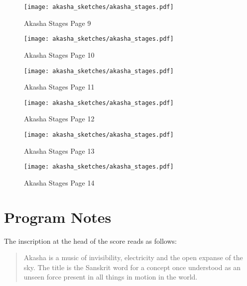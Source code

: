 \begin{figure}[H] %
    \texttt{[image: akasha\_sketches/akasha\_stages.pdf]}
    \caption{Akasha Stages Page 9}
    \label{fig:akashastagessketch-9}
\end{figure}

\begin{figure}[H] %
    \texttt{[image: akasha\_sketches/akasha\_stages.pdf]}
    \caption{Akasha Stages Page 10}
    \label{fig:akashastagessketch-10}
\end{figure}

\begin{figure}[H] %
    \texttt{[image: akasha\_sketches/akasha\_stages.pdf]}
    \caption{Akasha Stages Page 11}
    \label{fig:akashastagessketch-11}
\end{figure}

\begin{figure}[H] %
    \texttt{[image: akasha\_sketches/akasha\_stages.pdf]}
    \caption{Akasha Stages Page 12}
    \label{fig:akashastagessketch-12}
\end{figure}

\begin{figure}[H] %
    \texttt{[image: akasha\_sketches/akasha\_stages.pdf]}
    \caption{Akasha Stages Page 13}
    \label{fig:akashastagessketch-13}
\end{figure}

\begin{figure}[H] %
    \texttt{[image: akasha\_sketches/akasha\_stages.pdf]}
    \caption{Akasha Stages Page 14}
    \label{fig:akashastagessketch-14}
\end{figure}

\section{Program Notes}

The inscription at the head of the score reads as follows:

\begin{quote}
    \singlespacing
    Akasha is a music of invisibility, electricity and the open expanse of the sky. The title is the Sanskrit word for a concept once understood as an unseen force present in all things in motion in the world.
\end{quote}

